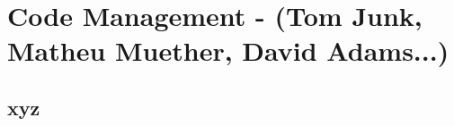 \chapter{Code Management - (Tom Junk, Matheu Muether, David Adams...)}
\label{ch:codemgmt}

\section{xyz}
\label{sec:codemgmt:xyz}  %
